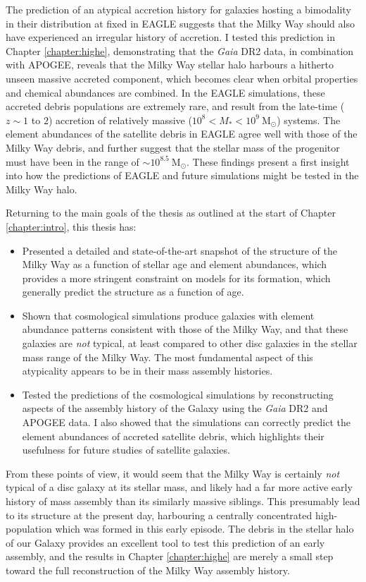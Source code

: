 The prediction of an atypical accretion history for galaxies hosting a bimodality in their \afe{} distribution at fixed \feh{} in EAGLE suggests that the Milky Way should also have experienced an irregular history of accretion. I tested this prediction in Chapter \ref{chapter:highe}, demonstrating that the \emph{Gaia} DR2 data, in combination with APOGEE, reveals that the Milky Way stellar halo harbours a hitherto unseen massive accreted component, which becomes clear when orbital properties and chemical abundances are combined. In the EAGLE simulations, these accreted debris populations are extremely rare, and result from the late-time ($z\sim 1$ to $2$) accretion of relatively massive ($10^{8} < M_{*} < 10^{9}\ \mathrm{M_{\odot}}$) systems. The element abundances of the satellite debris in EAGLE agree well with those of the Milky Way debris, and further suggest that the stellar mass of the progenitor must have been in the range of $\sim 10^{8.5}\ \mathrm{M_{\odot}}$. These findings present a first insight into how the predictions of EAGLE and future simulations might be tested in the Milky Way halo.

Returning to the main goals of the thesis as outlined at the 
start of Chapter \ref{chapter:intro}, this thesis has:
\begin{itemize}
    \item Presented a detailed and state-of-the-art snapshot of the structure of the Milky Way as a function of stellar age and element abundances, which provides a more stringent constraint on models for its formation, which generally predict the structure as a function of age.
    \item Shown that cosmological simulations produce galaxies with element abundance patterns consistent with those of the Milky Way, and that these galaxies are \emph{not} typical, at least compared to other disc galaxies in the stellar mass range of the Milky Way. The most fundamental aspect of this atypicality appears to be in their mass assembly histories.
    \item Tested the predictions of the cosmological simulations by reconstructing aspects of the assembly history of the Galaxy using the \emph{Gaia} DR2 and APOGEE data. I also showed that the simulations can correctly predict the element abundances of accreted satellite debris, which highlights their usefulness for future studies of satellite galaxies.
\end{itemize}
From these points of view, it would seem that the Milky Way is certainly \emph{not} typical of a disc galaxy at its stellar mass, and likely had a far more active early history of mass assembly than its similarly massive siblings. This presumably lead to its structure at the present day, harbouring a centrally concentrated high-\afe{} population which was formed in this early episode. The debris in the stellar halo of our Galaxy provides an excellent tool to test this prediction of an early assembly, and the results in Chapter \ref{chapter:highe} are merely a small step toward the full reconstruction of the Milky Way assembly history.


